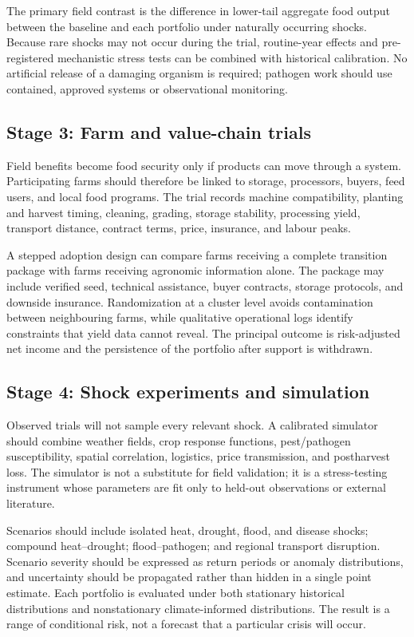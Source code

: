 \documentclass[conference]{IEEEtran}
\begin{document}
The primary field contrast is the difference in lower-tail aggregate food output between the baseline and each portfolio under naturally occurring shocks. Because rare shocks may not occur during the trial, routine-year effects and pre-registered mechanistic stress tests can be combined with historical calibration. No artificial release of a damaging organism is required; pathogen work should use contained, approved systems or observational monitoring.

\subsection{Stage 3: Farm and value-chain trials}
Field benefits become food security only if products can move through a system. Participating farms should therefore be linked to storage, processors, buyers, feed users, and local food programs. The trial records machine compatibility, planting and harvest timing, cleaning, grading, storage stability, processing yield, transport distance, contract terms, price, insurance, and labour peaks.

A stepped adoption design can compare farms receiving a complete transition package with farms receiving agronomic information alone. The package may include verified seed, technical assistance, buyer contracts, storage protocols, and downside insurance. Randomization at a cluster level avoids contamination between neighbouring farms, while qualitative operational logs identify constraints that yield data cannot reveal. The principal outcome is risk-adjusted net income and the persistence of the portfolio after support is withdrawn.

\subsection{Stage 4: Shock experiments and simulation}
Observed trials will not sample every relevant shock. A calibrated simulator should combine weather fields, crop response functions, pest/pathogen susceptibility, spatial correlation, logistics, price transmission, and postharvest loss. The simulator is not a substitute for field validation; it is a stress-testing instrument whose parameters are fit only to held-out observations or external literature.

Scenarios should include isolated heat, drought, flood, and disease shocks; compound heat--drought; flood--pathogen; and regional transport disruption. Scenario severity should be expressed as return periods or anomaly distributions, and uncertainty should be propagated rather than hidden in a single point estimate. Each portfolio is evaluated under both stationary historical distributions and nonstationary climate-informed distributions. The result is a range of conditional risk, not a forecast that a particular crisis will occur.
\end{document}
